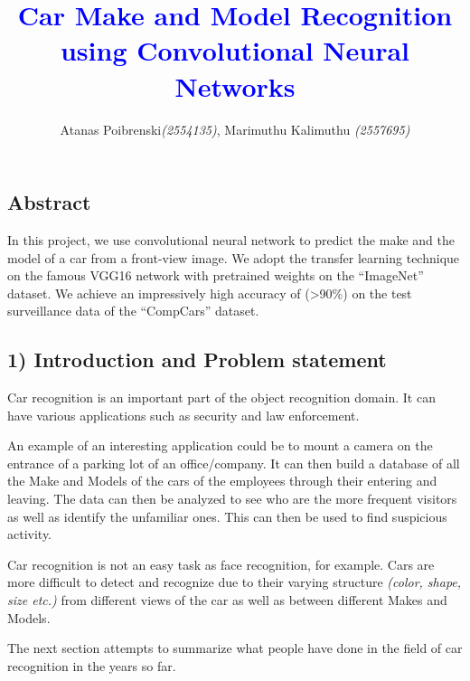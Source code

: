 \documentclass[a4paper]{article}
\title{\textcolor{blue}{\textbf{Car Make and Model Recognition using Convolutional Neural Networks}}}
\author{Atanas Poibrenski\textit{(2554135)}, Marimuthu Kalimuthu \textit{(2557695)}}
\begin{document}
\maketitle

\subsection*{Abstract}
\begin{itshape}
\flushleft
In this project, we use convolutional neural network to predict the make and the model of a car from a front-view image.
We adopt the transfer learning technique on the famous VGG16 network with pretrained weights on the ``ImageNet'' dataset. We achieve an impressively high accuracy of (>90\%) on the test surveillance data of the ``CompCars'' dataset.
\end{itshape}


\subsection*{1) Introduction and Problem statement}
\begin{justify}
Car recognition is an important part of the object recognition domain. It can have various applications such as security and law enforcement.

An example of an interesting application could be to mount a camera on the entrance of a parking lot of an office/company. It can then build a database of all the Make and Models of the cars of the employees through their entering and leaving. The data can then be analyzed to see who are the more frequent visitors as well as identify the unfamiliar ones. This can then be used to find suspicious activity.

Car recognition is not an easy task as face recognition, for example. Cars are more difficult to detect and recognize due to their varying structure \textit{(color, shape, size etc.)}
from different views of the car as well as between different Makes and Models.

The next section attempts to summarize what people have done in the field of car recognition in the years so far.
\end{justify}
\end{document}
